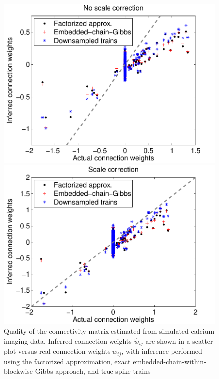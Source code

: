 \documentclass[aoas,preprint]{imsart}
\begin{document}
\begin{figure}[t!]
\centering
\begin{minipage}[c]{0.45\hsize}
\includegraphics[width=\hsize]{../figs/FigureA3_scatter_three}
\end{minipage}
\begin{minipage}[c]{0.45\hsize}
\includegraphics[width=\hsize]{../figs/FigureA3_scatter_three_corrected}
\end{minipage}
\caption{Quality of the connectivity matrix estimated from simulated
calcium imaging data. Inferred connection weights $\hat w_{ij}$ are
shown in a scatter plot versus real connection weights $w_{ij}$, with
inference performed using the factorized approximation, exact
embedded-chain-within-blockwise-Gibbs approach, and true spike trains
}
\end{figure}
\end{document}
